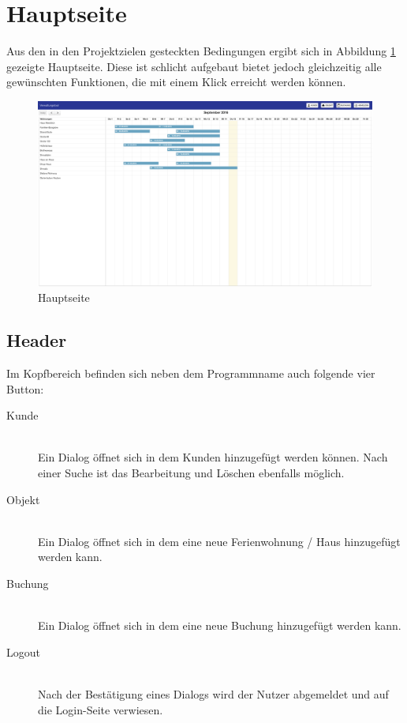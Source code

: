 \section{Hauptseite}
Aus den in den Projektzielen gesteckten Bedingungen ergibt sich in Abbildung \ref{frontend_mainpage} gezeigte Hauptseite.
Diese ist schlicht aufgebaut bietet jedoch gleichzeitig alle gewünschten Funktionen, die mit einem Klick erreicht werden können.

\begin{figure}[H]
\centering\includegraphics[width=1\textwidth]{images/frontend_mainpage.png}
\caption{Hauptseite}
\label{frontend_mainpage}
\end{figure}

\subsection{Header}
Im Kopfbereich befinden sich neben dem Programmname auch folgende vier Button:

\begin{description}
\item[Kunde]\hfill \\
Ein Dialog öffnet sich in dem Kunden hinzugefügt werden können. Nach einer Suche ist das Bearbeitung und Löschen ebenfalls möglich.
\item[Objekt]\hfill \\ 
Ein Dialog öffnet sich in dem eine neue Ferienwohnung / Haus hinzugefügt werden kann. 
\item[Buchung]\hfill \\ 
Ein Dialog öffnet sich in dem eine neue Buchung hinzugefügt werden kann. 
\item[Logout]\hfill \\ 
Nach der Bestätigung eines Dialogs wird der Nutzer abgemeldet und auf die Login-Seite verwiesen. 
\end{description}

